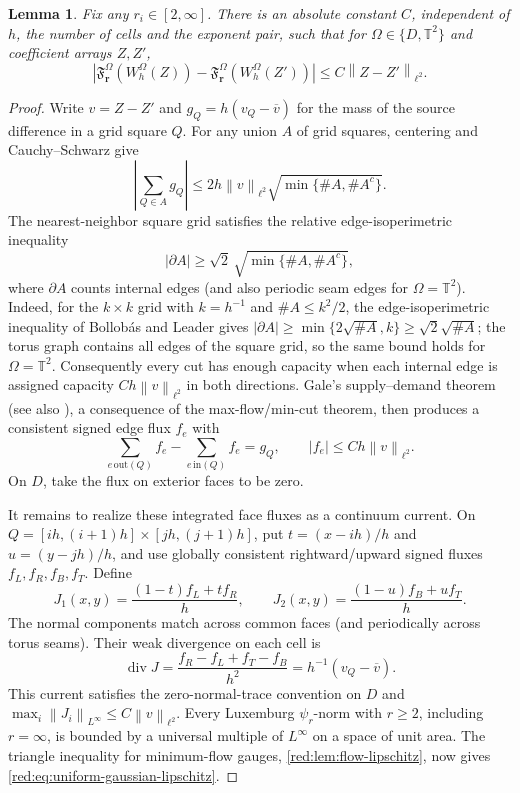 \documentclass[11pt]{article}
\newtheorem{lemma}[lemma]{Lemma}
\theoremstyle{definition}
\theoremstyle{remark}
\numberwithin{equation}{section}
\newcommand{\T}{\mathbb T}
\newcommand{\divv}{\operatorname{div}}
\newcommand{\norm}[1]{\left\|#1\right\|}
\begin{document}
\begin{lemma}
\label{red:lem:uniform-gaussian-lipschitz}
Fix any $r_i\in[2,\infty]$. There is an absolute constant $C$,
independent of $h$, the number of cells and the exponent pair, such
that for $\Omega\in\{D,\T^2\}$ and coefficient arrays $Z,Z'$,
\begin{equation}\label{red:eq:uniform-gaussian-lipschitz}
\left|\mathfrak F_{\boldsymbol r}^{\Omega}(W_h^{\Omega}(Z))-
\mathfrak F_{\boldsymbol r}^{\Omega}(W_h^{\Omega}(Z'))\right|
 \le C\norm{Z-Z'}_{\ell^2}.
\end{equation}
\end{lemma}
\begin{proof}
Write $v=Z-Z'$ and $g_Q=h(v_Q-\overline v)$ for the mass
of the source difference in a grid square $Q$. For any union $A$
of grid squares, centering and Cauchy--Schwarz give
\[
 \left|\sum_{Q\in A}g_Q\right|
 \le 2h\norm v_{\ell^2}\sqrt{\min\{\#A,\#A^c\}}.
\]
The nearest-neighbor square grid satisfies the relative
edge-isoperimetric inequality
\[
 |\partial A|\ge \sqrt2\,\sqrt{\min\{\#A,\#A^c\}},
\]
where $\partial A$ counts internal edges (and also periodic seam
edges for $\Omega=\T^2$). Indeed, for the $k\times k$ grid with
$k=h^{-1}$ and $\#A\le k^2/2$, the edge-isoperimetric inequality of
Bollob\'as and Leader \cite{BollobasLeader1991} gives
$|\partial A|\ge\min\{2\sqrt{\#A},k\}\ge\sqrt2\sqrt{\#A}$; the torus
graph contains all edges of the square grid, so the same bound holds
for $\Omega=\T^2$. Consequently every cut has enough
capacity when each internal edge is assigned capacity
$C h\norm v_{\ell^2}$ in both directions. Gale's supply--demand
theorem \cite{Gale1957} (see also \cite{Hoffman1960}), a consequence
of the max-flow/min-cut theorem, then
produces a consistent signed edge flux $f_e$ with
\[
 \sum_{e\,\mathrm{out}(Q)}f_e-
 \sum_{e\,\mathrm{in}(Q)}f_e=g_Q,
 \qquad |f_e|\le C h\norm v_{\ell^2}.
\]
On $D$, take the flux on exterior faces to be zero.

It remains to realize these integrated face fluxes as a
continuum current. On $Q=[ih,(i+1)h]\times[jh,(j+1)h]$, put
$t=(x-ih)/h$ and $u=(y-jh)/h$, and use globally consistent
rightward/upward signed fluxes $f_L,f_R,f_B,f_T$. Define
\begin{equation}\label{red:eq:face-current}
 J_1(x,y)=\frac{(1-t)f_L+tf_R}{h},\qquad
 J_2(x,y)=\frac{(1-u)f_B+uf_T}{h}.
\end{equation}
The normal components match across common faces (and periodically
across torus seams). Their weak divergence on each cell is
\[
 \divv J=\frac{f_R-f_L+f_T-f_B}{h^2}
 =h^{-1}(v_Q-\overline v).
\]
This current satisfies the zero-normal-trace convention on $D$ and
$\max_i\norm{J_i}_{L^\infty}\le C\norm v_{\ell^2}$. Every
Luxemburg $\psi_r$-norm with $r\ge2$, including $r=\infty$,
is bounded by a universal multiple of $L^\infty$ on a space of
unit area. The triangle inequality for minimum-flow gauges,
\cref{red:lem:flow-lipschitz}, now gives
\eqref{red:eq:uniform-gaussian-lipschitz}.
\end{proof}
\end{document}
